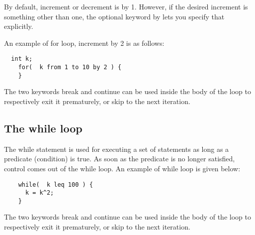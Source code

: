 By default, increment or decrement is by 1. However, if the desired increment is something other than one, the optional keyword \textsf{by} lets you specify that explicitly.

An example of \textsf{for} loop, increment by 2 is as follows: 
\begin{lstlisting}
  int k;
	for(  k from 1 to 10 by 2 ) {
	}
\end{lstlisting}
The two keywords \textsf{break} and \textsf{continue} can be used inside the body of the loop to respectively exit it prematurely, or skip to the next iteration.


\subsection{The while loop}

The  \textsf{while} statement is used for executing a set of statements as long as a predicate (condition) is true.	As soon as the predicate is no longer satisfied, control comes out of the \textsf{while} loop.
An example of \textsf{while} loop is given below:
\begin{lstlisting}
	while(  k leq 100 ) {
	  k = k^2;
	}
\end{lstlisting}
The two keywords \textsf{break} and \textsf{continue} can be used inside the body of the loop to respectively exit it prematurely, or skip to the next iteration.



  
